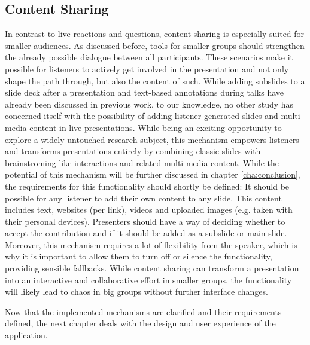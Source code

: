 \subsection{Content Sharing}
In contrast to live reactions and questions, content sharing is especially suited for smaller audiences. As discussed before, tools for smaller groups should strengthen the already possible dialogue between all participants. These scenarios make it possible for listeners to actively get involved in the presentation and not only shape the path through, but also the content of such. While adding subslides to a slide deck after a presentation \cite{Cheng:TreebasedOnlinePresentations} and text-based annotations \cite{Inoue:RealTimeQuestionnaire, Myers:CollaborationPDAs} during talks have already been discussed in previous work, to our knowledge, no other study has concerned itself with the possibility of adding listener-generated slides and multi-media content in live presentations. While being an exciting opportunity to explore a widely untouched research subject, this mechanism empowers listeners and transforms presentations entirely by combining classic slides with brainstroming-like interactions and related multi-media content. While the potential of this mechanism will be further discussed in chapter \ref{cha:conclusion}, the requirements for this functionality should shortly be defined: It should be possible for any listener to add their own content to any slide. This content includes text, websites (per link), videos and uploaded images (e.g. taken with their personal devices). Presenters should have a way of deciding whether to accept the contribution and if it should be added as a subslide or main slide. Moreover, this mechanism requires a lot of flexibility from the speaker, which is why it is important to allow them to turn off or silence the functionality, providing sensible fallbacks. While content sharing can transform a presentation into an interactive and collaborative effort in smaller groups, the functionality will likely lead to chaos in big groups without further interface changes.

Now that the implemented mechanisms are clarified and their requirements defined, the next chapter deals with the design and user experience of the application.


